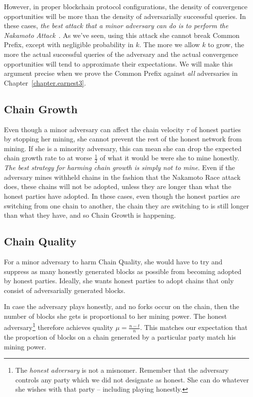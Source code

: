However, in proper blockchain protocol configurations, the density of convergence
opportunities will be more than the density of adversarially successful queries.
In these cases, \emph{the best attack that a minor adversary can do is to perform the
Nakamoto Attack}~\cite{nakamoto-wins}. As we've seen, using this attack she cannot break Common Prefix,
except with negligible probability in $k$. The more we allow $k$ to grow, the more the actual successful
queries of the adversary and the actual convergence opportunities will tend to
approximate their expectations. We will make this argument precise when we
prove the Common Prefix against \emph{all} adversaries in Chapter~\ref{chapter.earnest3}.

\subsection*{Chain Growth}
Even though a minor adversary can affect the chain velocity $\tau$ of honest
parties by stopping her mining, she cannot prevent the rest of the honest network
from mining. If she is a minority adversary, this can mean she can drop the expected
chain growth rate to at worse $\frac{1}{2}$ of what it would be were she to mine honestly.
\emph{The best strategy for harming chain growth is simply not to mine}.
Even if the adversary mines withheld chains in the fashion that the Nakamoto Race
attack does, these chains will not be adopted, unless they are longer than what
the honest parties have adopted. In these cases, even though the honest parties are
switching from one chain to another, the chain they are switching to is still longer
than what they have, and so Chain Growth is happening.

\subsection*{Chain Quality}
For a minor adversary to harm Chain Quality, she would have to try and suppress as many
honestly generated blocks as possible from becoming adopted by honest parties. Ideally,
she wants honest parties to adopt chains that only consist of adversarially generated blocks.

In case the adversary plays honestly, and no forks occur on the chain, then the number of
blocks she gets is proportional to her mining power. The honest adversary\footnote{The
\emph{honest adversary} is not a misnomer. Remember that the adversary controls any party which
we did not designate as honest. She can do whatever she wishes with that party -- including
playing honestly.}
therefore achieves quality $\mu = \frac{n - t}{n}$. This matches our expectation that
the proportion of blocks on a chain generated by a particular party match his mining power.

